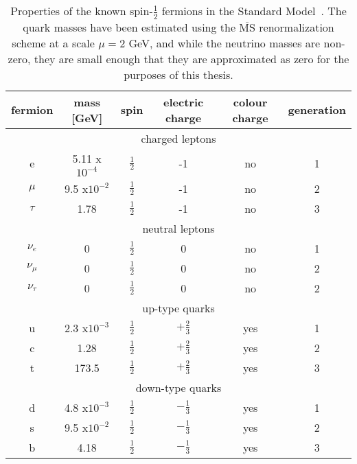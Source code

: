 \begin{table}
  \centering
  \begin{tabular}{ |c|c|c|c|c|c|}
  \hline
   fermion & mass [GeV] & spin & electric charge & colour charge & generation \\
  \hline
  \multicolumn{6}{|c|}{charged leptons} \\
  \hline
    e    & 5.11 x$10^{-4}$ & $\frac{1}{2}$ & -1 & no & 1 \\
  $\mu$  & 9.5 x$10^{-2}$  & $\frac{1}{2}$ & -1 & no & 2 \\
  $\tau$ & 1.78            & $\frac{1}{2}$ & -1 & no & 3 \\
  \hline
  \multicolumn{6}{|c|}{neutral leptons} \\
  \hline
  $\nu_e$      & 0 & $\frac{1}{2}$ & 0 & no & 1 \\
  $\nu_{\mu}$  & 0 & $\frac{1}{2}$ & 0 & no & 2 \\
  $\nu_{\tau}$ & 0 & $\frac{1}{2}$ & 0 & no & 2 \\
  \hline
  \multicolumn{6}{|c|}{up-type quarks} \\
  \hline
  u & 2.3 x$10^{-3}$ & $\frac{1}{2}$ & $+\frac{2}{3}$ & yes & 1 \\ 
  c & 1.28           & $\frac{1}{2}$ & $+\frac{2}{3}$ & yes & 2 \\
  t & 173.5          & $\frac{1}{2}$ & $+\frac{2}{3}$ & yes & 3 \\
  \hline
  \multicolumn{6}{|c|}{down-type quarks} \\
  \hline
  d & 4.8 x$10^{-3}$ & $\frac{1}{2}$ & $-\frac{1}{3}$ & yes & 1 \\
  s & 9.5 x$10^{-2}$ & $\frac{1}{2}$ & $-\frac{1}{3}$ & yes & 2 \\
  b & 4.18           & $\frac{1}{2}$ & $-\frac{1}{3}$ & yes & 3 \\
  \hline
  \end{tabular}
  \caption[Properties of known spin-$\frac{1}{2}$ bosons in the Standard Model.]
        {\small Properties of the known spin-$\frac{1}{2}$ fermions in the Standard Model~\cite{PDG}.  The quark masses have been estimated using the $\overline{\mathrm{MS}}$ renormalization scheme at a scale $\mu = 2$ GeV, and while the neutrino masses are non-zero, they are small enough that they are approximated as zero for the purposes of this thesis.}
\label{table:Fermions}
\end{table}


